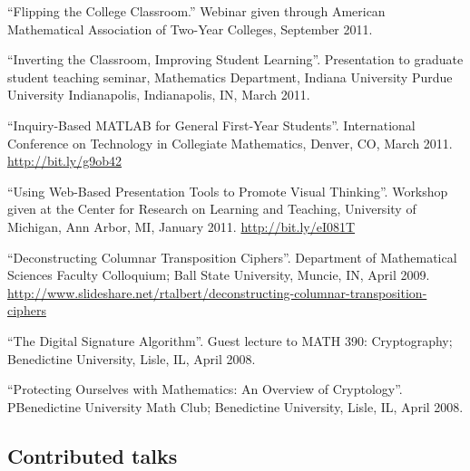 \documentclass[letterpaper]{article}
\renewenvironment{itemize}{
  \begin{list}{}{
    \setlength{\leftmargin}{1.5em}
	\setlength{\itemsep}{0in}
  }
}{
  \end{list}
}
\begin{document}
\begin{itemize}
	\item ``Flipping the College Classroom.'' Webinar given through American Mathematical Association of Two-Year Colleges, September 2011.
	\item  ``Inverting the Classroom, Improving Student Learning''. Presentation to graduate student teaching seminar, Mathematics Department, Indiana University Purdue University Indianapolis, Indianapolis, IN, March 2011.
	\item ``Inquiry-Based MATLAB for General First-Year Students''. International Conference on Technology in Collegiate Mathematics, Denver, CO, March 2011. \url{http://bit.ly/g9ob42}
	\item ``Using Web-Based Presentation Tools to Promote Visual Thinking''. Workshop given at the Center for Research on Learning and Teaching, University of Michigan, Ann Arbor, MI, January 2011. \url{http://bit.ly/eI081T}
	\item ``Deconstructing Columnar Transposition Ciphers''. Department of Mathematical Sciences Faculty Colloquium; Ball State University, Muncie, IN, April 2009. \url{http://www.slideshare.net/rtalbert/deconstructing-columnar-transposition-ciphers}
	\item ``The Digital Signature Algorithm''. Guest lecture to MATH 390: Cryptography; Benedictine University, Lisle, IL, April 2008.
	\item ``Protecting Ourselves with Mathematics: An Overview of Cryptology''. PBenedictine University Math Club; Benedictine University, Lisle, IL, April 2008.
\end{itemize}

\subsection*{Contributed talks}
\end{document}
